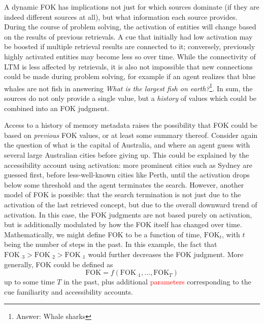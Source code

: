 \documentclass[10pt,letterpaper]{article}
\newcommand{\fixme}[2][]{#2}
\renewcommand{\fixme}[2][]{\textcolor{red}{#2}}
\newcommand{\negsub}[0]{\,^{\_}}
\newcommand{\fok}[0]{\text{FOK}}
\newcommand{\question}[2]{\textit{#1}\footnote{Answer: #2}}
\begin{document}
A dynamic FOK has implications not just for which sources dominate (if they are indeed different sources at all), but what information each source provides.
During the course of problem solving, the activation of entities will change based on the results of previous retrievals.
A cue that initially had low activation may be boosted if multiple retrieval results are connected to it; conversely, previously highly activated entities may become less so over time.
While the connectivity of LTM is less affected by retrievals, it is also not impossible that new connections could be made during problem solving, for example if an agent realizes that blue whales are not fish in answering \question{What is the largest fish on earth?}{Whale sharks}.
In sum, the sources do not only provide a single value, but a \textit{history} of values which could be combined into an FOK judgment.

Access to a history of memory metadata raises the possibility that FOK could be based on \textit{previous} FOK values, or at least some summary thereof.
Consider again the question of what is the capital of Australia, and where an agent guess with several large Australian cities before giving up.
This could be explained by the accessibility account using activation: more prominent cities such as Sydney are guessed first, before less-well-known cities like Perth, until the activation drops below some threshold and the agent terminates the search.
However, another model of FOK is possible: that the search termination is not just due to the activation of the last retrieved concept, but due to the overall downward trend of activation.
In this case, the FOK judgments are not based purely on activation, but is additionally modulated by how the FOK itself has changed over time.
Mathematically, we might define FOK to be a function of time, $\fok_t$, with $t$ being the number of steps in the past.
In this example, the fact that $\fok_{{\negsub}3} > \fok_{{\negsub}2} > \fok_{{\negsub}1}$ would further decreases the FOK judgment.
More generally, FOK could be defined as
$$\fok = f(\fok_{{\negsub}1}, ..., \fok_T)$$
up to some time $T$ in the past, plus additional \fixme{parameters} corresponding to the cue familiarity and accessibility accounts.
\end{document}
